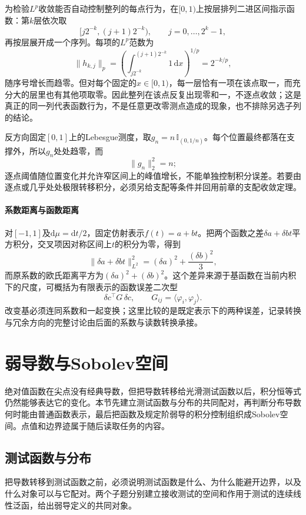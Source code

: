 为检验$L^p$收敛能否自动控制整列的每点行为，在$[0,1)$上按层排列二进区间指示函数：第$k$层依次取
\[
  [j2^{-k},(j+1)2^{-k}),\qquad j=0,\ldots,2^k-1,
\]
再按层展开成一个序列。每项的$L^p$范数为
\[
  \|h_{k,j}\|_p=\left(\int_{j2^{-k}}^{(j+1)2^{-k}}1\,\mathrm dx\right)^{1/p}=2^{-k/p},
\]
随序号增长而趋零。但对每个固定的$x\in[0,1)$，每一层恰有一项在该点取一，而充分大的层里也有其他项取零。因此整列在该点反复出现零和一，不逐点收敛；这是真正的同一列代表函数行为，不是任意更改零测点造成的现象，也不排除另选子列的结论。

反方向固定$[0,1]$上的Lebesgue测度，取$g_n=n\,\mathbb I_{(0,1/n)}$。每个位置最终都落在支撑外，所以$g_n$处处趋零，而
\[
  \|g_n\|_2^2=n;
\]
逐点阈值随位置变化并允许窄区间上的峰值增长，不能单独控制积分误差。若要由逐点或几乎处处极限转移积分，必须另给支配等条件并回用前章的支配收敛定理。

\paragraph{系数距离与函数距离}

对$[-1,1]$及$\mathrm d\mu=\mathrm dt/2$，固定仿射表示$f(t)=a+bt$。把两个函数之差$\delta a+\delta bt$平方积分，交叉项因对称区间上$t$的积分为零，得到
\[
  \|\delta a+\delta bt\|_{L^2}^2=(\delta a)^2+\frac{(\delta b)^2}{3},
\]
而原系数的欧氏距离平方为$(\delta a)^2+(\delta b)^2$。这个差异来源于基函数在当前内积下的尺度，可概括为有限表示的函数误差二次型
\[
  \delta c^{\top}G\,\delta c,\qquad G_{ij}=\langle\varphi_i,\varphi_j\rangle.
\]
改变基必须连同系数和一起变换；这里比较的是既定表示下的两种误差，记录转换与冗余方向的完整讨论由后面的系数与读数转换承接。

\section{弱导数与Sobolev空间}
\label{sec:weak-derivatives-sobolev}

绝对值函数在尖点没有经典导数，但把导数转移给光滑测试函数以后，积分恒等式仍然能够表达它的变化。本节先建立测试函数与分布的共同配对，再判断分布导数何时能由普通函数表示，最后把函数及规定阶弱导的积分控制组织成Sobolev空间。点值和边界迹属于随后读取任务的内容。

\subsection{测试函数与分布}
\label{subsec:test-functions-distributions}

把导数转移到测试函数之前，必须说明测试函数是什么、为什么能避开边界，以及什么对象可以与它配对。两个子题分别建立接收测试的空间和作用于测试的连续线性泛函，给出弱导定义的共同对象。

